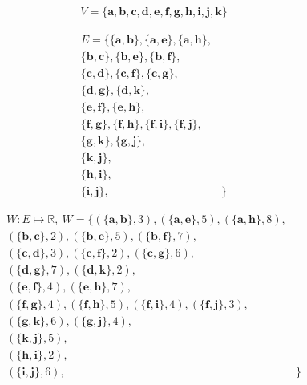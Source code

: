 \documentclass[12pt]{article}
\begin{document}
\begin{gather*}
V = \{\textbf{a}, \textbf{b}, \textbf{c}, \textbf{d}, \textbf{e}, \textbf{f}, \textbf{g}, \textbf{h}, \textbf{i}, \textbf{j}, \textbf{k}\}
\end{gather*}

\begin{align*}
E = \{
    \{\textbf{a}, \textbf{b}\},
    \{\textbf{a}, \textbf{e}\},
    \{\textbf{a}, \textbf{h}\},& \\
    \{\textbf{b}, \textbf{c}\},
    \{\textbf{b}, \textbf{e}\},
    \{\textbf{b}, \textbf{f}\},& \\
    \{\textbf{c}, \textbf{d}\},
    \{\textbf{c}, \textbf{f}\},
    \{\textbf{c}, \textbf{g}\},& \\
    \{\textbf{d}, \textbf{g}\},
    \{\textbf{d}, \textbf{k}\},& \\
    \{\textbf{e}, \textbf{f}\},
    \{\textbf{e}, \textbf{h}\},& \\
    \{\textbf{f}, \textbf{g}\},
    \{\textbf{f}, \textbf{h}\},
    \{\textbf{f}, \textbf{i}\},
    \{\textbf{f}, \textbf{j}\},& \\
    \{\textbf{g}, \textbf{k}\},
    \{\textbf{g}, \textbf{j}\},& \\
    \{\textbf{k}, \textbf{j}\},& \\
    \{\textbf{h}, \textbf{i}\},& \\
    \{\textbf{i}, \textbf{j}\},&
    \}
\end{align*}

\begin{align*}
W: E \mapsto \mathbb{R},\ W = \{
    (\{\textbf{a}, \textbf{b}\}, 3),
    (\{\textbf{a}, \textbf{e}\}, 5),
    (\{\textbf{a}, \textbf{h}\}, 8),& \\
    (\{\textbf{b}, \textbf{c}\}, 2),
    (\{\textbf{b}, \textbf{e}\}, 5),
    (\{\textbf{b}, \textbf{f}\}, 7),& \\
    (\{\textbf{c}, \textbf{d}\}, 3),
    (\{\textbf{c}, \textbf{f}\}, 2),
    (\{\textbf{c}, \textbf{g}\}, 6),& \\
    (\{\textbf{d}, \textbf{g}\}, 7),
    (\{\textbf{d}, \textbf{k}\}, 2),& \\
    (\{\textbf{e}, \textbf{f}\}, 4),
    (\{\textbf{e}, \textbf{h}\}, 7),& \\
    (\{\textbf{f}, \textbf{g}\}, 4),
    (\{\textbf{f}, \textbf{h}\}, 5),
    (\{\textbf{f}, \textbf{i}\}, 4),
    (\{\textbf{f}, \textbf{j}\}, 3),& \\
    (\{\textbf{g}, \textbf{k}\}, 6),
    (\{\textbf{g}, \textbf{j}\}, 4),& \\
    (\{\textbf{k}, \textbf{j}\}, 5),& \\
    (\{\textbf{h}, \textbf{i}\}, 2),& \\
    (\{\textbf{i}, \textbf{j}\}, 6),&
\}
\end{align*}
\end{document}
